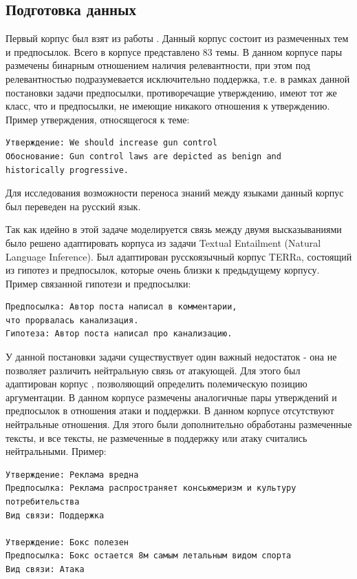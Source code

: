 \subsection{Подготовка данных}

Первый корпус был взят из работы \cite{aharoni2014benchmark}. Данный корпус состоит из размеченных тем и предпосылок. Всего в корпусе представлено 83 темы. В данном корпусе пары размечены бинарным отношением  наличия релевантности, при этом под релевантностью подразумевается исключительно поддержка, т.е. в рамках данной постановки задачи предпосылки, противоречащие утверждению, имеют тот же класс, что и предпосылки, не имеющие никакого отношения к утверждению. Пример утверждения, относящегося к теме:
\begin{verbatim}
Утверждение: We should increase gun control
Обоснование: Gun control laws are depicted as benign and 
historically progressive.
\end{verbatim}

Для исследования возможности переноса знаний между языками данный корпус был переведен на русский язык.

Так как идейно в этой задаче моделируется связь между двумя высказываниями было решено адаптировать корпуса из задачи Textual Entailment (Natural Language Inference). Был адаптирован русскоязычный корпус TERRa, состоящий из гипотез и предпосылок, которые очень близки к предыдущему корпусу. Пример связанной гипотези и предпосылки:
\begin{verbatim}
Предпосылка: Автор поста написал в комментарии, 
что прорвалась канализация.
Гипотеза: Автор поста написал про канализацию.
\end{verbatim}

У данной постановки задачи существуствует один важный недостаток - она не позволяет различить нейтральную связь от атакующей. Для этого был адаптирован корпус \cite{bar2017stance}, позволяющий определить полемическую позицию аргументации. В данном  корпусе размечены аналогичные пары утверждений и предпосылок в отношения атаки и поддержки. В данном корпусе отсутствуют нейтральные отношения. Для этого были дополнительно обработаны размеченные тексты, и все тексты, не размеченные в поддержку или атаку считались нейтральными. Пример:
\begin{verbatim}
Утверждение: Реклама вредна
Предпосылка: Реклама распространяет консьюмеризм и культуру потребительства
Вид связи: Поддержка

Утверждение: Бокс полезен
Предпосылка: Бокс остается 8м самым летальным видом спорта
Вид связи: Атака
\end{verbatim}

